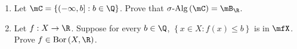 \documentclass[pmath450]{subfiles}
\begin{document}
    \begin{exercise}{}
        \vspace{-11pt}
        \begin{enumerate}
            \item Let $\mC=\left\lbrace \left( -\infty,b \right]: b\in\Q \right\rbrace$. Prove that $\sigalg\left( \mC \right)=\mB_{\R}$.
            \item Let $f:X\to\R$. Suppose for every $b\in\Q$, $\left\lbrace x\in X: f\left( x \right)\leq b \right\rbrace$ is in $\mfX$. Prove $f\in\bor\left( X,\R \right)$.
        \end{enumerate}
    \end{exercise}

    \placeqed[tl;dr]
\end{document}
